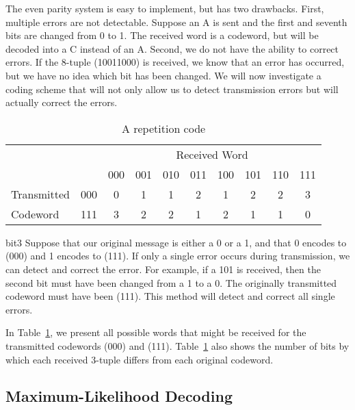 The even parity system is easy to implement, but has two drawbacks.
First, multiple errors are not detectable. Suppose an A is sent and 
the first and seventh bits are changed from 0 to 1. The received word
is a codeword, but will be decoded into a C instead of an A.
Second, we do not have the ability to correct errors.  If the 8-tuple
(10011000) is received, we know that an error has occurred, but we
have no idea which bit has been changed. We will now investigate a
coding scheme that will not only allow us to detect transmission
errors but will actually correct the errors. 
 
\begin{table}[htb]
\caption{A repetition code\label{algcodes:table0}}{\small
\begin{center}
\begin{tabular}{|lc|cccccccc|}
\hline
& & \multicolumn{8}{|c|}{Received Word}    \\
            &     & 000 & 001 & 010 & 011 & 100 & 101 & 110
& 111 \\ \hline
Transmitted & 000 & 0   & 1   & 1   & 2   & 1   & 2   & 2
& 3 \\
Codeword   & 111 & 3   &  2  & 2   &  1  &  2  &   1 &  1
&  0 \\ \hline
\end{tabular}
\end{center}
}
\end{table}

\begin{example}{bit3}
Suppose that our original message is either a 0 or a 1, and that 0
encodes to (000) and 1 encodes to (111). If only a single
error occurs during transmission, we can detect and correct the
error. For example, if a 101 is received, then the second bit must
have been changed from a 1 to a 0.  The originally transmitted
codeword must have been (111). 	This method will detect and correct 
all single errors. 
 
 
In Table~\ref{algcodes:table0}, we present all possible words that might be received
for the transmitted codewords (000) and (111). Table~\ref{algcodes:table0} also shows 
the number of bits by which each received 3-tuple differs from each
original codeword. 
\end{example}

\subsection{Maximum-Likelihood Decoding}
 
